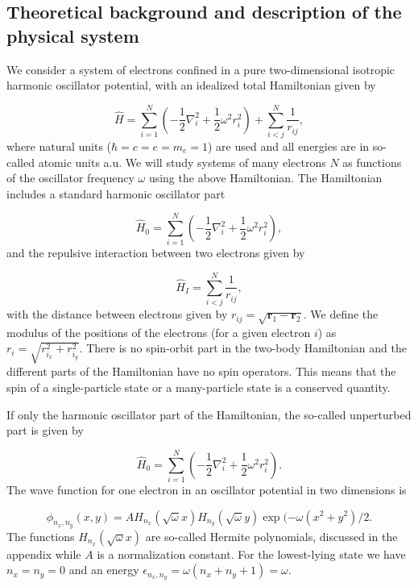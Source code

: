 \documentclass[%
oneside,                 %
final,                   %
10pt]{article}
\begin{document}
\subsection*{Theoretical background and description of the physical system}

We consider a system of electrons confined in a pure two-dimensional 
isotropic harmonic oscillator potential, with an idealized  total Hamiltonian given by

\begin{equation}
\label{eq:finalH}
\hat{H}=\sum_{i=1}^{N} \left(  -\frac{1}{2} \nabla_i^2 + \frac{1}{2} \omega^2r_i^2  \right)+\sum_{i<j}^{N}\frac{1}{r_{ij}},
\end{equation}
where natural units ($\hbar=c=e=m_e=1$) are used and all energies are in so-called atomic units a.u. We will study systems of many electrons $N$ as functions of the oscillator frequency  $\omega$ using the above Hamiltonian.  The Hamiltonian includes a standard harmonic oscillator part

\begin{equation*}
\hat{H}_0=\sum_{i=1}^{N} \left(  -\frac{1}{2} \nabla_i^2 + \frac{1}{2} \omega^2r_i^2  \right),
\end{equation*}
and the repulsive interaction between two electrons given by

\begin{equation*}
\hat{H}_I=\sum_{i < j}^{N}\frac{1}{r_{ij}},
\end{equation*}
with the distance between electrons given by $r_{ij}=\sqrt{\bm{r}_1-\bm{r}_2}$. We define the 
modulus of the positions of the electrons (for a given electron $i$) as $r_i = \sqrt{r_{i_x}^2+r_{i_y}^2}$.
There is no spin-orbit part in the two-body Hamiltonian and the different parts of the Hamiltonian have no spin operators. This means that the spin of a single-particle state or a many-particle state is a conserved quantity. 

If only the harmonic oscillator part of the Hamiltonian,
the so-called unperturbed part is given by

\begin{equation*} \hat{H}_0=\sum_{i=1}^{N} \left(  -\frac{1}{2} \nabla_i^2 + \frac{1}{2} \omega^2r_i^2  \right).
\end{equation*}
The wave function for one electron in an oscillator potential in two dimensions is

\begin{equation*}
\phi_{n_x,n_y}(x,y) = A H_{n_x}(\sqrt{\omega}x)H_{n_y}(\sqrt{\omega}y)\exp{(-\omega(x^2+y^2)/2}.
\end{equation*}
The functions $H_{n_x}(\sqrt{\omega}x)$ are so-called Hermite polynomials, discussed in the appendix while $A$ is a normalization constant. 
For the lowest-lying state we have $n_x=n_y=0$ and an energy $\epsilon_{n_x,n_y}=\omega(n_x+n_y+1) = \omega$.
\end{document}
